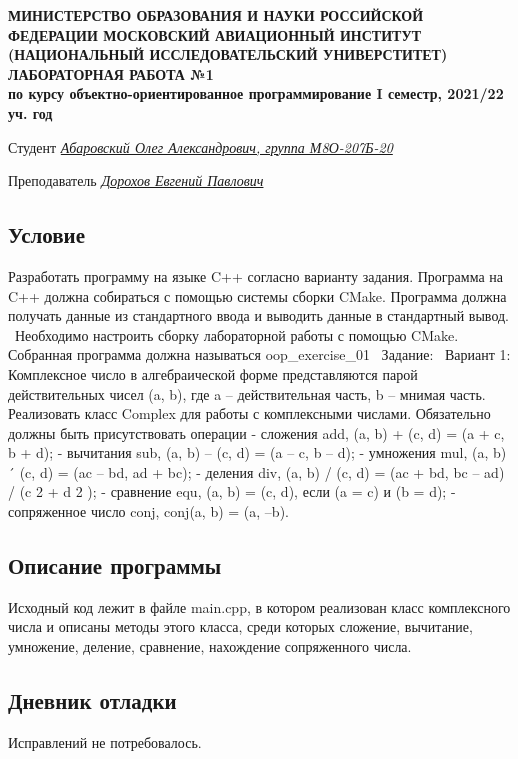 \documentclass[12pt]{article}
\begin{document}
\begin{titlepage}
\begin{center}
\textbf{МИНИСТЕРСТВО ОБРАЗОВАНИЯ И НАУКИ РОССИЙСКОЙ ФЕДЕРАЦИИ
\medskip
МОСКОВСКИЙ АВИАЦИОННЫЙ ИНСТИТУТ
(НАЦИОНАЛЬНЫЙ ИССЛЕДОВАТЕЛЬСКИЙ УНИВЕРСТИТЕТ)
\vfill\vfill
{\Huge ЛАБОРАТОРНАЯ РАБОТА №1} \\
по курсу объектно-ориентированное программирование
I семестр, 2021/22 уч. год}
\end{center}
\vfill

Студент \uline{\it {Абаровский Олег Александрович, группа М8О-207Б-20}\hfill}

Преподаватель \uline{\it {Дорохов Евгений Павлович}\hfill}

\vfill
\end{titlepage}

\subsection*{Условие}

Разработать программу на языке C++ согласно варианту задания. Программа на C++
должна собираться с помощью системы сборки CMake. Программа должна получать
данные из стандартного ввода и выводить данные в стандартный вывод. \
Необходимо настроить сборку лабораторной работы с помощью CMake. Собранная
программа должна называться oop_exercise_01 \
Задание: \
Вариант 1: Комплексное число в алгебраической форме представляются парой
действительных чисел (a, b), где a – действительная часть, b – мнимая
часть. Реализовать класс Complex для работы с комплексными числами.
Обязательно должны быть присутствовать операции
- сложения add, (a, b) + (c, d) = (a + c, b + d);
- вычитания sub, (a, b) – (c, d) = (a – c, b – d);
- умножения mul, (a, b) ´ (c, d) = (ac – bd, ad + bc);
- деления div, (a, b) / (c, d) = (ac + bd, bc – ad) / (c 2 + d 2 );
- сравнение equ, (a, b) = (c, d), если (a = c) и (b = d);
- сопряженное число conj, conj(a, b) = (a, –b).

\subsection*{Описание программы}

Исходный код лежит в файле main.cpp, в котором реализован класс комплексного числа и описаны методы этого класса, среди которых сложение, вычитание, умножение, деление, сравнение, нахождение сопряженного числа.

\subsection*{Дневник отладки}
Исправлений не потребовалось.
\end{document}
